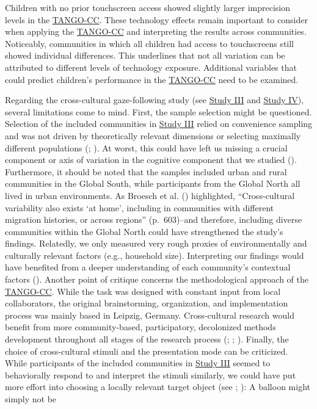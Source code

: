 \documentclass[
]{scrbook}
\begin{document}
Children with no prior touchscreen access showed slightly larger imprecision levels in the \hyperref[acronyms_TANGO-CC]{TANGO-CC}. These technology effects remain important to consider when applying the \hyperref[acronyms_TANGO-CC]{TANGO-CC} and interpreting the results across communities. Noticeably, communities in which all children had access to touchscreens still showed individual differences. This underlines that not all variation can be attributed to different levels of technology exposure. Additional variables that could predict children's performance in the \hyperref[acronyms_TANGO-CC]{TANGO-CC} need to be examined.

Regarding the cross-cultural gaze-following study (see \hyperref[studyIII]{Study III} and \hyperref[studyIV]{Study IV}), several limitations come to mind. First, the sample selection might be questioned. Selection of the included communities in \hyperref[studyIII]{Study III} relied on convenience sampling and was not driven by theoretically relevant dimensions or selecting maximally different populations (; ). At worst, this could have left us missing a crucial component or axis of variation in the cognitive component that we studied (). Furthermore, it should be noted that the samples included urban and rural communities in the Global South, while participants from the Global North all lived in urban environments. As Broesch et al. () highlighted, ``Cross-cultural variability also exists `at home', including in communities with different migration histories, or across regions'' (p.~603)\thinspace --\thinspace and therefore, including diverse communities within the Global North could have strengthened the study's findings. Relatedly, we only measured very rough proxies of environmentally and culturally relevant factors (e.g., household size). Interpreting our findings would have benefited from a deeper understanding of each community's contextual factors (). Another point of critique concerns the methodological approach of the \hyperref[acronyms_TANGO-CC]{TANGO-CC}. While the task was designed with constant input from local collaborators, the original brainstorming, organization, and implementation process was mainly based in Leipzig, Germany. Cross-cultural research would benefit from more community-based, participatory, decolonized methods development throughout all stages of the research process (; ; ). Finally, the choice of cross-cultural stimuli and the presentation mode can be criticized. While participants of the included communities in \hyperref[studyIII]{Study III} seemed to behaviorally respond to and interpret the stimuli similarly, we could have put more effort into choosing a locally relevant target object (see ; ): A balloon might simply not be 
\end{document}
